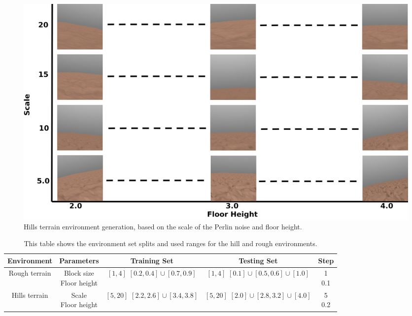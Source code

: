         \begin{figure}[ht]
            \centering
            \includegraphics[width=\linewidth]{./resources/hills_terrain.png}
            \caption{Hills terrain environment generation, based on the scale of the Perlin noise and floor height.}
            \label{fig:hills_terrain}
        \end{figure}

        \begin{table}[ht]
            \centering
            \begin{tabular}{|c|c|c|c|c|}
            \hline
            \textbf{Environment} & \textbf{Parameters} & \textbf{Training Set} & \textbf{Testing Set} & \textbf{Step} \\ \hline
                Rough terrain & 
                \makecell{Block size \\ Floor height} & 
                \makecell{$[1, 4]$ \\ $[0.2, 0.4] \cup [0.7, 0.9]$} & 
                \makecell{$[1, 4]$ \\ $[0.1] \cup [0.5, 0.6] \cup [1.0]$} & 
                \makecell{1 \\ 0.1}
            \\ \hline
                Hills terrain &
                \makecell{Scale \\ Floor height} & 
                \makecell{$[5, 20]$ \\ $[2.2, 2.6] \cup [3.4, 3.8]$} & 
                \makecell{$[5, 20]$ \\ $[2.0] \cup [2.8, 3.2] \cup [4.0]$} & 
                \makecell{5 \\ 0.2}
            \\ \hline
        \end{tabular}
        \caption{This table shows the environment set splits and used ranges for the hill and rough environments.}
        \label{tab:split_table}
        \end{table}

